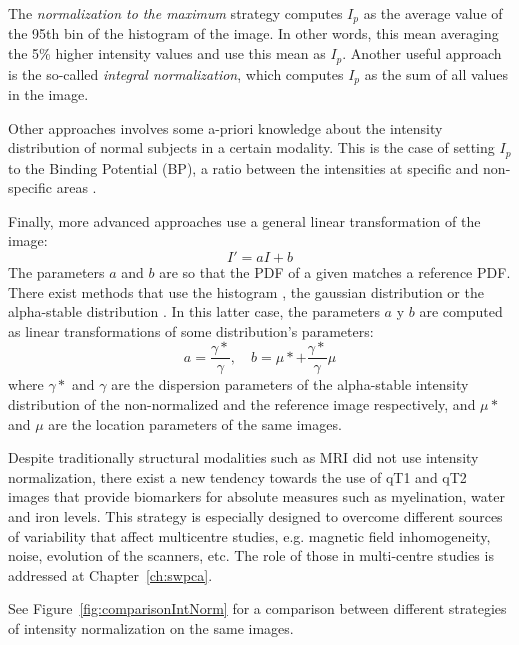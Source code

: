 The \emph{normalization to the maximum} strategy computes $I_p$ as the average value of the 95th bin of the histogram of the image. In other words, this mean averaging the 5\% higher intensity values and use this mean as $I_p$. Another useful approach is the so-called \emph{integral normalization}, which computes $I_p$ as the sum of all values in the image. 

Other approaches involves some a-priori knowledge about the intensity distribution of normal subjects in a certain modality. This is the case of setting $I_p$ to the Binding Potential (BP), a ratio between the intensities at specific and non-specific areas \cite{Scherfler2005}. 

Finally, more advanced approaches use a general linear transformation of the image: 
\begin{equation}
	I' = a I + b
\end{equation}
The parameters $a$ and $b$ are so that the \ac{PDF} of a given matches a reference \ac{PDF}. There exist methods that use the histogram \cite{Arndt1996}, the gaussian distribution or the alpha-stable distribution \cite{Salas-Gonzalez2013}. In this latter case, the parameters $a$ y $b$ are computed as linear transformations of some distribution's parameters: 
\begin{equation}
	a = \frac{\gamma*}{\gamma}, \quad b = \mu* + \frac{\gamma*}{\gamma} \mu
\end{equation}
where $\gamma*$ and $\gamma$ are the dispersion parameters of the alpha-stable intensity distribution of the non-normalized and the reference image respectively, and $\mu*$ and $\mu$ are the location parameters of the same images. 

Despite traditionally structural modalities such as \ac{MRI} did not use intensity normalization, there exist a new tendency towards the use of \ac{qT1} and \ac{qT2} images \cite{Weiskopf2013} that provide biomarkers for absolute measures such as myelination, water and iron levels. This strategy is especially designed to overcome different sources of variability that affect multicentre studies, e.g. magnetic field inhomogeneity, noise, evolution of the scanners, etc. The role of those in multi-centre studies is addressed at Chapter~\ref{ch:swpca}. 

See Figure~\ref{fig:comparisonIntNorm} for a comparison between different strategies of intensity normalization on the same images. 


